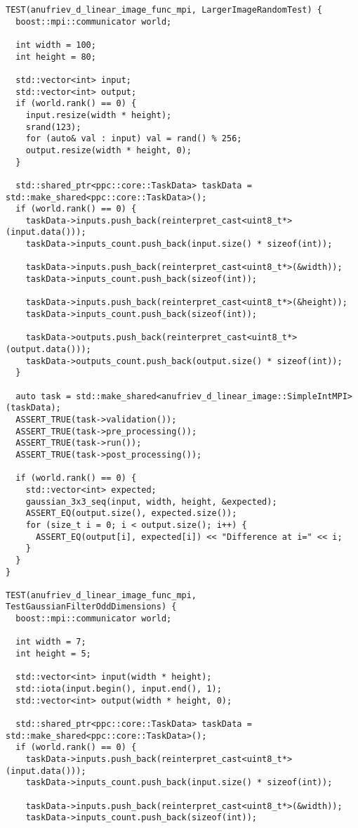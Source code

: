 \documentclass[12pt]{article}
\begin{document}
\begin{lstlisting}
TEST(anufriev_d_linear_image_func_mpi, LargerImageRandomTest) {
  boost::mpi::communicator world;

  int width = 100;
  int height = 80;

  std::vector<int> input;
  std::vector<int> output;
  if (world.rank() == 0) {
    input.resize(width * height);
    srand(123);
    for (auto& val : input) val = rand() % 256;
    output.resize(width * height, 0);
  }

  std::shared_ptr<ppc::core::TaskData> taskData = std::make_shared<ppc::core::TaskData>();
  if (world.rank() == 0) {
    taskData->inputs.push_back(reinterpret_cast<uint8_t*>(input.data()));
    taskData->inputs_count.push_back(input.size() * sizeof(int));

    taskData->inputs.push_back(reinterpret_cast<uint8_t*>(&width));
    taskData->inputs_count.push_back(sizeof(int));

    taskData->inputs.push_back(reinterpret_cast<uint8_t*>(&height));
    taskData->inputs_count.push_back(sizeof(int));

    taskData->outputs.push_back(reinterpret_cast<uint8_t*>(output.data()));
    taskData->outputs_count.push_back(output.size() * sizeof(int));
  }

  auto task = std::make_shared<anufriev_d_linear_image::SimpleIntMPI>(taskData);
  ASSERT_TRUE(task->validation());
  ASSERT_TRUE(task->pre_processing());
  ASSERT_TRUE(task->run());
  ASSERT_TRUE(task->post_processing());

  if (world.rank() == 0) {
    std::vector<int> expected;
    gaussian_3x3_seq(input, width, height, &expected);
    ASSERT_EQ(output.size(), expected.size());
    for (size_t i = 0; i < output.size(); i++) {
      ASSERT_EQ(output[i], expected[i]) << "Difference at i=" << i;
    }
  }
}

TEST(anufriev_d_linear_image_func_mpi, TestGaussianFilterOddDimensions) {
  boost::mpi::communicator world;

  int width = 7;
  int height = 5;

  std::vector<int> input(width * height);
  std::iota(input.begin(), input.end(), 1);
  std::vector<int> output(width * height, 0);

  std::shared_ptr<ppc::core::TaskData> taskData = std::make_shared<ppc::core::TaskData>();
  if (world.rank() == 0) {
    taskData->inputs.push_back(reinterpret_cast<uint8_t*>(input.data()));
    taskData->inputs_count.push_back(input.size() * sizeof(int));

    taskData->inputs.push_back(reinterpret_cast<uint8_t*>(&width));
    taskData->inputs_count.push_back(sizeof(int));


\end{lstlisting}
\end{document}
